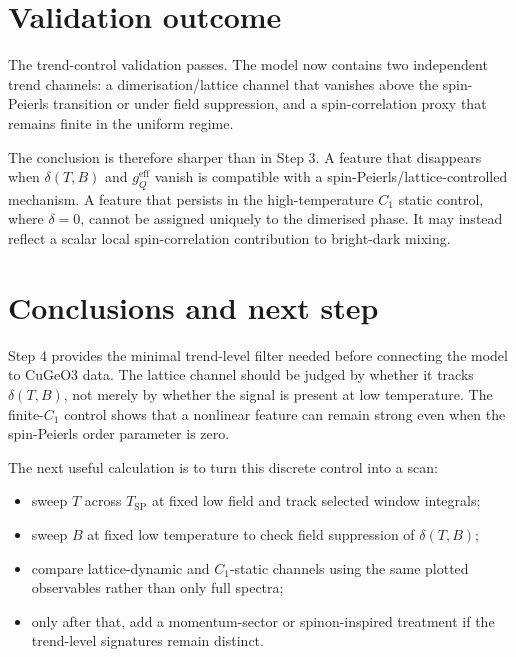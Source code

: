 \documentclass[11pt]{article}
\begin{document}
\section{Validation outcome}
The trend-control validation passes.  The model now contains two independent
trend channels: a dimerisation/lattice channel that vanishes above the
spin-Peierls transition or under field suppression, and a spin-correlation
proxy that remains finite in the uniform regime.

The conclusion is therefore sharper than in Step 3.  A feature that disappears
when $\delta(T,B)$ and $g_Q^{\mathrm{eff}}$ vanish is compatible with a
spin-Peierls/lattice-controlled mechanism.  A feature that persists in the
high-temperature $C_1$ static control, where $\delta=0$, cannot be assigned
uniquely to the dimerised phase.  It may instead reflect a scalar local
spin-correlation contribution to bright-dark mixing.

\section{Conclusions and next step}
Step 4 provides the minimal trend-level filter needed before connecting the
model to CuGeO3 data.  The lattice channel should be judged by whether it tracks
$\delta(T,B)$, not merely by whether the signal is present at low temperature.
The finite-$C_1$ control shows that a nonlinear feature can remain strong even
when the spin-Peierls order parameter is zero.

The next useful calculation is to turn this discrete control into a scan:
\begin{itemize}
\item sweep $T$ across $T_{\mathrm{SP}}$ at fixed low field and track selected
window integrals;
\item sweep $B$ at fixed low temperature to check field suppression of
$\delta(T,B)$;
\item compare lattice-dynamic and $C_1$-static channels using the same plotted
observables rather than only full spectra;
\item only after that, add a momentum-sector or spinon-inspired treatment if
the trend-level signatures remain distinct.
\end{itemize}
\end{document}
